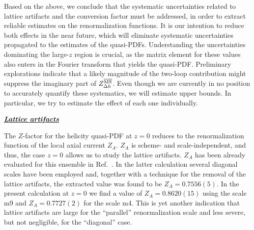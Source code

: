 \vspace*{0.5cm}
Based on the above, we conclude that the systematic uncertainties related to lattice artifacts and the conversion factor must be addressed,
in order to extract reliable estimates on the renormalization functions. It is our intention to reduce both effects in the near future, which
will eliminate systematic uncertainties propagated to the estimates of the quasi-PDFs.
Understanding the uncertainties dominating the large-$z$ region is crucial, as the matrix element for these values also enters in the Fourier
transform that yields the quasi-PDF. Preliminary explorations indicate that a likely magnitude of the two-loop contribution might suppress
the imaginary part of $Z_{\Delta h}^{\overline{\rm MS}}$. Even though we are currently in no position to accurately quantify these systematics,
we will estimate upper bounds. In particular, we try to estimate the effect of each one individually.


\vskip 0.75cm
\centerline{\bf\underline{\textit{Lattice artifacts}}}
\vskip 0.25cm

The $Z$-factor for the helicity quasi-PDF at $z{=}0$ reduces to the renormalization function of the local axial current $Z_A$.
$Z_A$ is scheme- and scale-independent, and thus, the case $z{=}0$ allows us to study the lattice artifacts.  $Z_A$ has been
already evaluated for this ensemble in Ref.~\cite{Alexandrou:2015sea}. In the latter calculation several diagonal scales have
been employed and, together with a technique for the removal of the lattice artifacts, the extracted value was found to be
$Z_A{=}0.7556(5)$. In the present calculation at $z{=}0$ we find a value of $Z_A{=}0.8620(15)$ using the scale m9 and
$Z_A{=}0.7727(2)$ for the scale m4. This is yet another indication that lattice artifacts are large for the  ``parallel''
renormalization scale and less severe, but not negligible, for the ``diagonal'' case.


